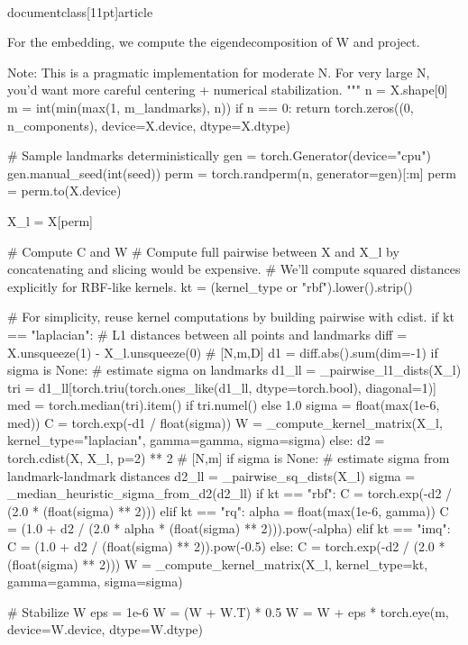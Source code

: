 \\documentclass[11pt]{article}
\begin{document}
\begin{CodeBlock}
    For the embedding, we compute the eigendecomposition of W and project.

    Note: This is a pragmatic implementation for moderate N. For very large N, you'd want
    more careful centering + numerical stabilization.
    """
    n = X.shape[0]
    m = int(min(max(1, m_landmarks), n))
    if n == 0:
        return torch.zeros((0, n_components), device=X.device, dtype=X.dtype)

    # Sample landmarks deterministically
    gen = torch.Generator(device="cpu")
    gen.manual_seed(int(seed))
    perm = torch.randperm(n, generator=gen)[:m]
    perm = perm.to(X.device)

    X_l = X[perm]

    # Compute C and W
    # Compute full pairwise between X and X_l by concatenating and slicing would be expensive.
    # We'll compute squared distances explicitly for RBF-like kernels.
    kt = (kernel_type or "rbf").lower().strip()

    # For simplicity, reuse kernel computations by building pairwise with cdist.
    if kt == "laplacian":
        # L1 distances between all points and landmarks
        diff = X.unsqueeze(1) - X_l.unsqueeze(0)  # [N,m,D]
        d1 = diff.abs().sum(dim=-1)
        if sigma is None:
            # estimate sigma on landmarks
            d1_ll = _pairwise_l1_dists(X_l)
            tri = d1_ll[torch.triu(torch.ones_like(d1_ll, dtype=torch.bool), diagonal=1)]
            med = torch.median(tri).item() if tri.numel() else 1.0
            sigma = float(max(1e-6, med))
        C = torch.exp(-d1 / float(sigma))
        W = _compute_kernel_matrix(X_l, kernel_type="laplacian", gamma=gamma, sigma=sigma)
    else:
        d2 = torch.cdist(X, X_l, p=2) ** 2  # [N,m]
        if sigma is None:
            # estimate sigma from landmark-landmark distances
            d2_ll = _pairwise_sq_dists(X_l)
            sigma = _median_heuristic_sigma_from_d2(d2_ll)
        if kt == "rbf":
            C = torch.exp(-d2 / (2.0 * (float(sigma) ** 2)))
        elif kt == "rq":
            alpha = float(max(1e-6, gamma))
            C = (1.0 + d2 / (2.0 * alpha * (float(sigma) ** 2))).pow(-alpha)
        elif kt == "imq":
            C = (1.0 + d2 / (float(sigma) ** 2)).pow(-0.5)
        else:
            C = torch.exp(-d2 / (2.0 * (float(sigma) ** 2)))
        W = _compute_kernel_matrix(X_l, kernel_type=kt, gamma=gamma, sigma=sigma)

    # Stabilize W
    eps = 1e-6
    W = (W + W.T) * 0.5
    W = W + eps * torch.eye(m, device=W.device, dtype=W.dtype)


\end{CodeBlock}
\end{document}
